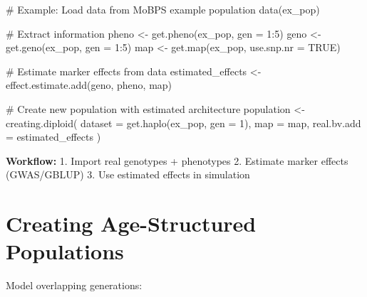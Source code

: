 \documentclass[
  letterpaper,
]{book}
\newenvironment{Shaded}{\begin{snugshade}}{\end{snugshade}}
\newcommand{\AttributeTok}[1]{\textcolor[rgb]{0.40,0.45,0.13}{#1}}
\newcommand{\CommentTok}[1]{\textcolor[rgb]{0.37,0.37,0.37}{#1}}
\newcommand{\ConstantTok}[1]{\textcolor[rgb]{0.56,0.35,0.01}{#1}}
\newcommand{\DecValTok}[1]{\textcolor[rgb]{0.68,0.00,0.00}{#1}}
\newcommand{\FunctionTok}[1]{\textcolor[rgb]{0.28,0.35,0.67}{#1}}
\newcommand{\NormalTok}[1]{\textcolor[rgb]{0.00,0.23,0.31}{#1}}
\newcommand{\OtherTok}[1]{\textcolor[rgb]{0.00,0.23,0.31}{#1}}
\newcommand{\SpecialCharTok}[1]{\textcolor[rgb]{0.37,0.37,0.37}{#1}}
\begin{document}
\begin{Shaded}
\begin{Highlighting}[]
\CommentTok{\# Example: Load data from MoBPS example population}
\FunctionTok{data}\NormalTok{(ex\_pop)}

\CommentTok{\# Extract information}
\NormalTok{pheno }\OtherTok{\textless{}{-}} \FunctionTok{get.pheno}\NormalTok{(ex\_pop, }\AttributeTok{gen =} \DecValTok{1}\SpecialCharTok{:}\DecValTok{5}\NormalTok{)}
\NormalTok{geno }\OtherTok{\textless{}{-}} \FunctionTok{get.geno}\NormalTok{(ex\_pop, }\AttributeTok{gen =} \DecValTok{1}\SpecialCharTok{:}\DecValTok{5}\NormalTok{)}
\NormalTok{map }\OtherTok{\textless{}{-}} \FunctionTok{get.map}\NormalTok{(ex\_pop, }\AttributeTok{use.snp.nr =} \ConstantTok{TRUE}\NormalTok{)}

\CommentTok{\# Estimate marker effects from data}
\NormalTok{estimated\_effects }\OtherTok{\textless{}{-}} \FunctionTok{effect.estimate.add}\NormalTok{(geno, pheno, map)}

\CommentTok{\# Create new population with estimated architecture}
\NormalTok{population }\OtherTok{\textless{}{-}} \FunctionTok{creating.diploid}\NormalTok{(}
  \AttributeTok{dataset =} \FunctionTok{get.haplo}\NormalTok{(ex\_pop, }\AttributeTok{gen =} \DecValTok{1}\NormalTok{),}
  \AttributeTok{map =}\NormalTok{ map,}
  \AttributeTok{real.bv.add =}\NormalTok{ estimated\_effects}
\NormalTok{)}
\end{Highlighting}
\end{Shaded}

\textbf{Workflow:} 1. Import real genotypes + phenotypes 2. Estimate
marker effects (GWAS/GBLUP) 3. Use estimated effects in simulation

\section{Creating Age-Structured Populations}\label{sec-age-structure}

Model overlapping generations:
\end{document}
